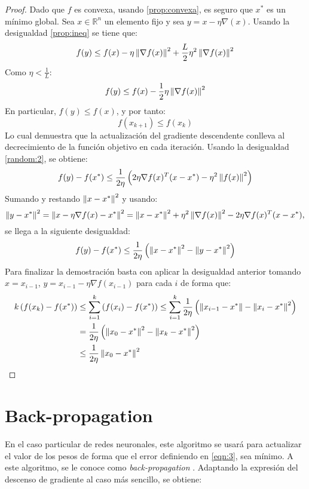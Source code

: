 \begin{proof}
    Dado que $f$ es convexa, usando \ref*{prop:convexa}, es seguro que $x^*$ es un mínimo global. Sea $x\in\mathbb{R}^n$ un elemento fijo y sea
    $y=x-\eta\nabla (x)$. Usando la desigualdad \ref*{prop:ineq} se tiene que:
    \[
        f(y) \leq f(x) - \eta\left\lVert\nabla f(x)\right\rVert^2 + \frac{L}{2}\eta^2\left\lVert\nabla f(x)\right\rVert^2
    \]
    Como $\eta<\frac{1}{L}$:
    \begin{equation}\label{random:1}
        f(y) \leq f(x) - \frac{1}{2}\eta \left\lVert\nabla f(x)\right\rVert^2
    \end{equation}
    En particular, $f(y)\leq f(x)$, y por tanto:
    \[
        f(x_{k+1}) \leq f(x_k)
    \]
    Lo cual demuestra que la actualización del gradiente descendente conlleva al decrecimiento de la función objetivo en cada iteración. Usando la desigualdad
    \ref*{random:2}, se obtiene:
    \[
        f(y) - f(x^*) \leq \frac{1}{2\eta}\left( 2\eta \nabla f(x)^T(x-x^*) - \eta^2\left\lVert f(x)\right\rVert^2 \right)
    \]
    Sumando y restando $\left\lVert x-x^*\right\rVert^2$ y usando:
    \[
        \left\lVert y-x^*\right\rVert^2 = \left\lVert x-\eta \nabla f(x)-x^*\right\rVert^2 = \left\lVert x-x^*\right\rVert^2 + \eta^2\left\lVert\nabla f(x)\right\rVert^2 - 2\eta \nabla f(x)^T(x-x^*),
    \]
    se llega a la siguiente desigualdad:
    \[
        f(y) - f(x^*) \leq \frac{1}{2\eta} \left( \left\lVert x-x^*\right\rVert^2 - \left\lVert y-x^*\right\rVert^2 \right)
    \]
    Para finalizar la demostración basta con aplicar la desigualdad anterior tomando $x=x_{i-1}$, $y=x_{i-1}-\eta\nabla f(x_{i-1})$ para cada
    $i$ de forma que:
    \begin{align*}
        k\left( f(x_k) - f(x^*) \right) & \leq \displaystyle \sum_{i=1}^k \left( f(x_i) - f(x^*) \right) \leq \displaystyle \sum_{i=1}^k \frac{1}{2\eta}\left( \left\lVert x_{i-1}-x^*\right\rVert - \left\lVert x_i - x^*\right\rVert^2 \right) \\
              & = \frac{1}{2\eta} \left( \left\lVert x_0 - x^*\right\rVert^2 - \left\lVert x_k-x^*\right\rVert^2 \right) \\
              & \leq \frac{1}{2\eta} \left\lVert x_0-x^*\right\rVert^2
    \end{align*}
\end{proof}

\section{Back-propagation}

En el caso particular de redes neuronales, este algoritmo se usará para actualizar el valor de los pesos
de forma que el error definiendo en \ref{eqn:3}, sea mínimo. A este algoritmo, se le conoce como
\textit{back-propagation} \cite{rumelhart1986learning}. Adaptando la expresión del descenso de gradiente al caso más sencillo, se obtiene:

